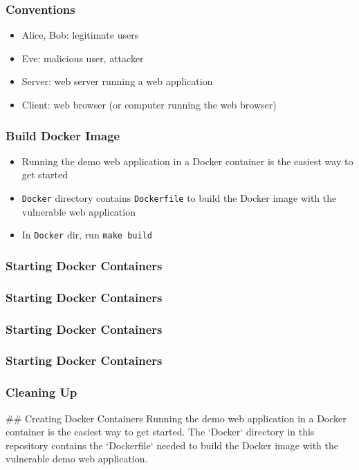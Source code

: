 \begin{frame}
    \frametitle{Conventions}
    \begin{itemize}
        \item Alice, Bob: legitimate users
        \item Eve: malicious user, attacker
        \item Server: web server running a web application
        \item Client: web browser (or computer running the web browser)
    \end{itemize}
\end{frame}

\begin{frame}[fragile]
    \frametitle{Build Docker Image}
    \begin{itemize}
        \item Running the demo web application in a Docker container is the easiest way to get started
        \item \texttt{Docker} directory contains \texttt{Dockerfile} to build the Docker image with the vulnerable web application
        \item In \texttt{Docker} dir, run \verb|make build|
    \end{itemize}

\end{frame}

\begin{frame}
    \frametitle{Starting Docker Containers}

\end{frame}

\begin{frame}
    \frametitle{Starting Docker Containers}

\end{frame}

\begin{frame}
    \frametitle{Starting Docker Containers}

\end{frame}

\begin{frame}
    \frametitle{Starting Docker Containers}

\end{frame}


\begin{frame}
    \frametitle{Cleaning Up}

\end{frame}


## Creating Docker Containers
Running the demo web application in a Docker container is the easiest way to get started. The `Docker` directory in this repository contains the `Dockerfile` needed to build the Docker image with the vulnerable demo web application.

